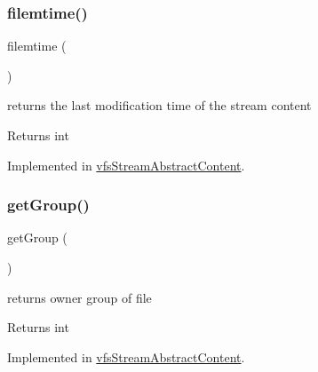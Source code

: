 \subsubsection{\texorpdfstring{filemtime()}{filemtime()}}
{\footnotesize\ttfamily filemtime (\begin{DoxyParamCaption}{ }\end{DoxyParamCaption})}

returns the last modification time of the stream content

\begin{DoxyReturn}{Returns}
int 
\end{DoxyReturn}


Implemented in \mbox{\hyperlink{classorg_1_1bovigo_1_1vfs_1_1vfs_stream_abstract_content_ad730553073cd7d21080fe7c2770ef457}{vfs\+Stream\+Abstract\+Content}}.

\mbox{\label{interfaceorg_1_1bovigo_1_1vfs_1_1vfs_stream_content_a4f44e7bc9de772c21b4304d11e87bf16}} 
\subsubsection{\texorpdfstring{get\+Group()}{getGroup()}}
{\footnotesize\ttfamily get\+Group (\begin{DoxyParamCaption}{ }\end{DoxyParamCaption})}

returns owner group of file

\begin{DoxyReturn}{Returns}
int 
\end{DoxyReturn}


Implemented in \mbox{\hyperlink{classorg_1_1bovigo_1_1vfs_1_1vfs_stream_abstract_content_a4f44e7bc9de772c21b4304d11e87bf16}{vfs\+Stream\+Abstract\+Content}}.

\mbox{\label{interfaceorg_1_1bovigo_1_1vfs_1_1vfs_stream_content_a3d0963e68bb313b163a73f2803c64600}} 
